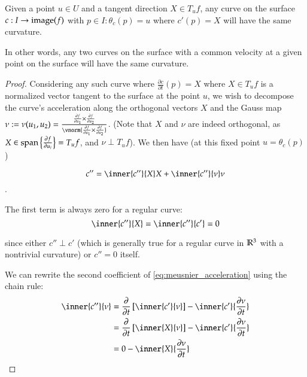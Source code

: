 		\begin{theorem} \label{thm:meusnier}
			Given a point $u \in U $ and a tangent direction $X \in T_u f$,
		    any curve on the surface $c: I \to \mathrm{image}(f)$ with $p\in I : \theta_c(p) = u$
		    where $c'(p) = X$ will have the same curvature.
		\end{theorem}
		
		
		In other words, any two curves on the surface with a common velocity at a given point on the surface will have the same curvature.
		\begin{proof}
		Considering any such curve where $\frac{\partial c}{\partial t}(p) = X$ where $X \in T_u f$ is a normalized vector tangent to the surface at the point $u$,
		we wish to decompose the curve's acceleration along the  orthogonal vectors $X$ and
		the Gauss map $\nu := \nu(u_1, u_2) =
			\frac{\frac{\partial f}{\partial u_1} \times \frac{\partial f}{\partial u_2}}
			{\vnorm{\frac{\partial f}{\partial u_1} \times \frac{\partial f}{\partial u_2}}}$.
			(Note that $X$ and $\nu$ are indeed orthogonal,
			as $ X \in \mathrm{span}\left\{\frac{\partial f}{\partial u_i}\right\} = T_u f$, and
			$\nu \perp T_u f$).
			 We then have (at this fixed point $u=\theta_c(p)$)
			
			\begin{equation} \label{eq:meusnier_acceleration}
				c'' = \inner{c''}{X} X + \inner{c''}{\nu}\nu
				\end{equation}. 
		
		The first term is always zero for a regular curve:
		\[ \inner{c''}{X} = \inner{c''}{c'} = 0 \]
		
		since either $c'' \perp c'$ (which is generally true for a regular curve in $\mathbb{R}^3$ with a nontrivial curvature) or $c'' = 0$ itself.  
		
		We can rewrite the second coefficient of \cref{eq:meusnier_acceleration} using the chain rule: %
		\begin{align}
			\inner{c''}{\nu} &=
			\frac{\partial}{\partial t}\left[ \inner{c'}{\nu} \right]
				- \inner{c'}{\frac{\partial \nu}{\partial t}} \\
				&= \frac{\partial}{\partial t}\left[ \inner{X}{\nu} \right]
				- \inner{c'}{\frac{\partial \nu}{\partial t}} \\
				&= 0 - \inner{X}{\frac{\partial \nu}{\partial t}}
				\end{align}
		

\end{proof}
